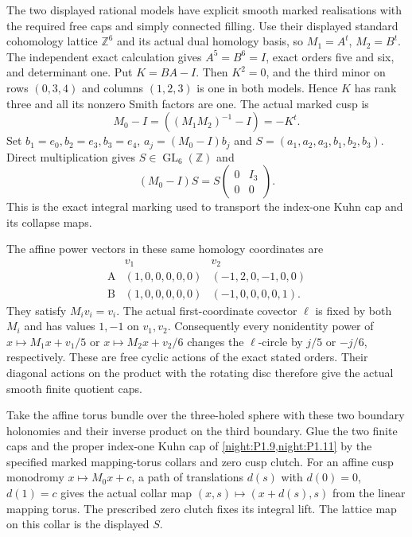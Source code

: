 \item The two displayed rational models have explicit smooth marked
realisations with the required free caps and simply connected filling.
Use their displayed standard cohomology lattice $\mathbb Z^6$ and its
actual dual homology basis, so $M_1=A^t$, $M_2=B^t$.
The independent exact calculation gives $A^5=B^6=I$, exact orders five
and six, and determinant one. Put $K=BA-I$. Then $K^2=0$, and the
third minor on rows $(0,3,4)$ and columns $(1,2,3)$ is one in both
models. Hence $K$ has rank three and all its nonzero Smith factors
are one. The actual marked cusp is
\[
 M_0-I=((M_1M_2)^{-1}-I)=-K^t.
\]
Set $b_1=e_0,b_2=e_3,b_3=e_4$, $a_j=(M_0-I)b_j$ and
$S=(a_1,a_2,a_3,b_1,b_2,b_3)$. Direct multiplication gives
$S\in\operatorname{GL}_6(\mathbb Z)$ and
\[
 (M_0-I)S=S\begin{pmatrix}0&I_3\\0&0\end{pmatrix}.
\]
This is the exact integral marking used to transport the index-one
Kuhn cap and its collapse maps.

The affine power vectors in these same homology coordinates are
\[
\begin{array}{c|cc}
 &v_1&v_2\\\hline
 \mathrm A&(1,0,0,0,0,0)&(-1,2,0,-1,0,0)\\
 \mathrm B&(1,0,0,0,0,0)&(-1,0,0,0,0,1).
\end{array}
\]
They satisfy $M_iv_i=v_i$. The actual first-coordinate covector
$\ell$ is fixed by both $M_i$ and has values $1,-1$ on $v_1,v_2$.
Consequently every nonidentity power of
$x\mapsto M_1x+v_1/5$ or $x\mapsto M_2x+v_2/6$ changes the
$\ell$-circle by $j/5$ or $-j/6$, respectively. These are free
cyclic actions of the exact stated orders. Their diagonal actions
on the product with the rotating disc therefore give the actual
smooth finite quotient caps.

Take the affine torus bundle over the three-holed sphere with these
two boundary holonomies and their inverse product on the third
boundary. Glue the two finite caps and the proper index-one Kuhn
cap of \cref{night:P1.9,night:P1.11} by the
specified marked mapping-torus collars and zero cusp clutch.
For an affine cusp monodromy $x\mapsto M_0x+c$, a path of translations
$d(s)$ with $d(0)=0$, $d(1)=c$ gives the actual collar map
$(x,s)\mapsto(x+d(s),s)$ from the linear mapping torus. The prescribed
zero clutch fixes its integral lift. The lattice map on this collar
is the displayed $S$.

